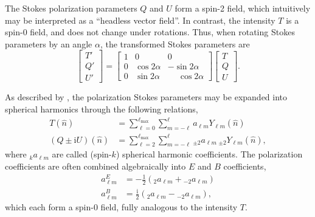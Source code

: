 \documentclass[twocolumn]{aa}
\begin{document}
The Stokes polarization parameters $Q$ and $U$ form a spin-2 field,
which intuitively may be interpreted as a ``headless vector
field''. In contrast, the intensity $T$ is a spin-0 field, and does
not change under rotations. Thus, when rotating Stokes parameters by
an angle $\alpha$, the transformed Stokes parameters are
\begin{equation}
  \left[
    \begin{array}{c}
      T' \\
      Q' \\
      U'
    \end{array}
    \right]
  =
  \left[
    \begin{array}{ccc}
      1 & 0 & 0 \\
      0 & \cos 2\alpha &  -\sin 2\alpha \\
      0 & \sin 2\alpha &  \phantom{-}\cos 2\alpha
    \end{array}
    \right]  
  \left[
    \begin{array}{c}
      T \\
      Q \\
      U
    \end{array}
    \right].
\end{equation}

As described by \citet{zaldarriaga1997}, the polarization Stokes
parameters may be expanded into spherical harmonics through the
following relations,
\begin{align}
  T(\hat{n}) &=
  \sum_{\ell=0}^{\ell_{\mathrm{max}}} \sum_{m=-\ell}^{\ell} a_{\ell m} 
  Y_{\ell m} (\hat{n})\\
  (Q\pm \mathrm iU)(\hat{n}) &=
  \sum_{\ell=2}^{\ell_{\mathrm{max}}} \sum_{m=-\ell}^{\ell} {_{\pm2}}a_{\ell m} 
    \,{_{\pm2}}Y_{\ell m} (\hat{n}),
\end{align}
where $_ka_{\ell m}$ are called (spin-$k$) spherical harmonic
coefficients. The polarization coefficients are often combined
algebraically into $E$ and $B$ coefficients,
\begin{align}
  a_{\ell m}^E &= -\frac{1}{2}\left(_{2}a_{\ell m} + {_{-2}}a_{\ell m}
  \right)\\
  a_{\ell m}^B &= \frac{\mathrm i}{2}\left(_{2}a_{\ell m} - {_{-2}}a_{\ell m} \right),
\end{align}
which each form a spin-0 field, fully analogous to the intensity
$T$.
\end{document}

